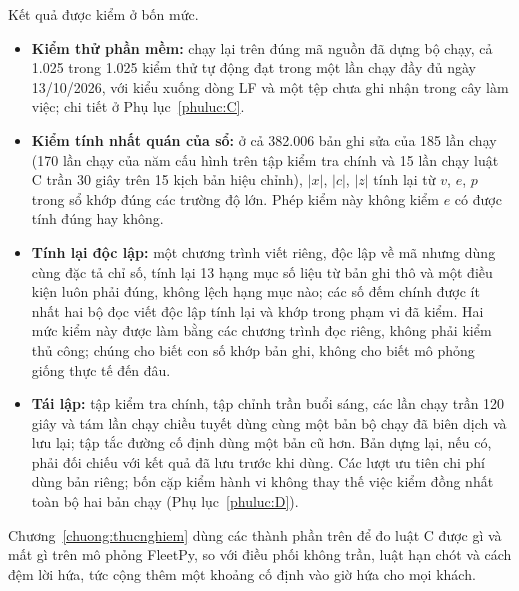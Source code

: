 Kết quả được kiểm ở bốn mức.
\begin{itemize}[leftmargin=1.2cm,itemsep=2pt,topsep=3pt]
\item \textbf{Kiểm thử phần mềm:} chạy lại trên đúng mã nguồn đã dựng bộ chạy, cả 1.025 trong 1.025 kiểm thử tự động
đạt trong một lần chạy đầy đủ ngày 13/10/2026, với kiểu xuống dòng LF và một tệp chưa ghi nhận trong cây làm việc;
chi tiết ở Phụ lục~\ref{phuluc:C}.
\item \textbf{Kiểm tính nhất quán của sổ:} ở cả 382.006 bản ghi sửa của 185 lần chạy (170 lần chạy của năm cấu hình
trên tập kiểm tra chính và 15 lần chạy luật C trần 30 giây trên 15 kịch bản hiệu chỉnh), $|x|$, $|c|$, $|z|$ tính
lại từ $v$, $e$, $p$ trong sổ khớp đúng các trường độ lớn. Phép kiểm này không kiểm $e$ có được tính đúng hay không.
\item \textbf{Tính lại độc lập:} một chương trình viết riêng, độc lập về mã nhưng dùng cùng đặc tả chỉ số, tính lại
13 hạng mục số liệu từ bản ghi thô và một điều kiện luôn phải đúng, không lệch hạng mục nào; các số đếm chính được
ít nhất hai bộ đọc viết độc lập tính lại và khớp trong phạm vi đã kiểm. Hai mức kiểm này được làm bằng các chương
trình đọc riêng, không phải kiểm thủ công; chúng cho biết con số khớp bản ghi, không cho biết mô phỏng giống thực tế
đến đâu.
\item \textbf{Tái lập:} tập kiểm tra chính, tập chỉnh trần buổi sáng, các lần chạy trần 120 giây và tám lần chạy chiều
tuyết dùng cùng một bản bộ chạy đã biên dịch và lưu lại; tập tắc đường cố định dùng một bản cũ hơn. Bản dựng lại, nếu có,
phải đối chiếu với kết quả đã lưu trước khi dùng. Các lượt ưu tiên chi phí dùng bản riêng; bốn cặp kiểm
hành vi không thay thế việc kiểm đồng nhất toàn bộ hai bản chạy (Phụ lục~\ref{phuluc:D}).
\end{itemize}

Chương~\ref{chuong:thucnghiem} dùng các thành phần trên để đo luật C được gì và mất gì trên mô phỏng FleetPy, so
với điều phối không trần, luật hạn chót và cách đệm lời hứa, tức cộng thêm một khoảng cố định vào giờ hứa cho mọi
khách.
